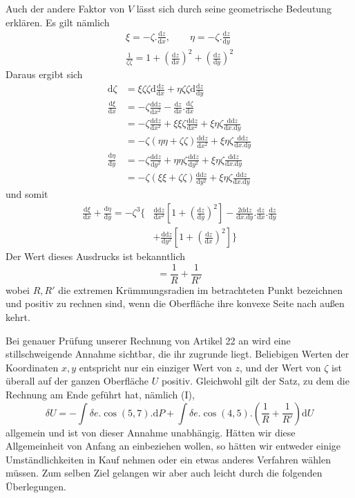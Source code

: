 Auch der andere Faktor von $V$ lässt sich durch seine geometrische Bedeutung erklären. Es gilt nämlich
\[
\begin{gathered}
\xi=-\zeta.\frac{\mathrm{d}z}{\mathrm{d}x},\qquad \eta=-\zeta.\frac{\mathrm{d}z}{\mathrm{d}y}\\
\frac{1}{\zeta\zeta}=1+(\frac{\mathrm{d}z}{\mathrm{d}x})^2+(\frac{\mathrm{d}z}{\mathrm{d}y})^2
\end{gathered}
\]
Daraus ergibt sich
\[
\begin{aligned}
\mathrm{d}\zeta&=\xi\zeta\zeta\mathrm{d}\frac{\mathrm{d}z}{\mathrm{d}x}+\eta\zeta\zeta\mathrm{d}\frac{\mathrm{d}z}{\mathrm{d}y}\\
\frac{\mathrm{d}\xi}{\mathrm{d}x}&=-\zeta\frac{\mathrm{dd}z}{\mathrm{d}x^2}-\frac{\mathrm{d}z}{\mathrm{d}x}.\frac{\mathrm{d}\zeta}{\mathrm{d}x}\\
&=-\zeta\frac{\mathrm{dd}z}{\mathrm{d}x^2}+\xi\xi\zeta\frac{\mathrm{dd}z}{\mathrm{d}x^2}+\xi\eta\zeta\frac{\mathrm{dd}z}{\mathrm{d}x.\mathrm{d}y}\\
&=-\zeta(\eta\eta+\zeta\zeta)\frac{\mathrm{dd}z}{\mathrm{d}x^2}+\xi\eta\zeta\frac{\mathrm{dd}z}{\mathrm{d}x.\mathrm{d}y}\\
\frac{\mathrm{d}\eta}{\mathrm{d}y}&=-\zeta\frac{\mathrm{dd}z}{\mathrm{d}y^2}+\eta\eta\zeta\frac{\mathrm{dd}z}{\mathrm{d}y^2}+\xi\eta\zeta\frac{\mathrm{dd}z}{\mathrm{d}x.\mathrm{d}y}\\
&=-\zeta(\xi\xi+\zeta\zeta)\frac{\mathrm{dd}z}{\mathrm{d}y^2}+\xi\eta\zeta\frac{\mathrm{dd}z}{\mathrm{d}x.\mathrm{d}y}
\end{aligned}
\]
und somit
\[
\begin{aligned}
\frac{\mathrm{d}\xi}{\mathrm{d}x}+\frac{\mathrm{d}\eta}{\mathrm{d}y}=-\zeta^3\big\{&\frac{\mathrm{dd}z}{\mathrm{d}x^2}[1+(\frac{\mathrm{d}z}{\mathrm{d}y})^2]-\frac{2\mathrm{dd}z}{\mathrm{d}x.\mathrm{d}y}.\frac{\mathrm{d}z}{\mathrm{d}x}.\frac{\mathrm{d}z}{\mathrm{d}y}\\
&+\frac{\mathrm{dd}z}{\mathrm{d}y^2}[1+(\frac{\mathrm{d}z}{\mathrm{d}x})^2]\big\}
\end{aligned}
\]
Der Wert dieses Ausdrucks ist bekanntlich
\[
=\frac{1}{R}+\frac{1}{R'}
\]
wobei $R,R'$ die extremen Krümmungsradien im betrachteten Punkt bezeichnen und positiv zu rechnen sind, wenn die Oberfläche ihre konvexe Seite nach außen kehrt.

Bei genauer Prüfung unserer Rechnung von Artikel 22 an wird eine stillschweigende Annahme sichtbar, die ihr zugrunde liegt. Beliebigen Werten der Koordinaten $x,y$ entspricht nur ein einziger Wert von $z$, und der Wert von $\zeta$ ist überall auf der ganzen Oberfläche $U$ positiv. Gleichwohl gilt der Satz, zu dem die Rechnung am Ende geführt hat, nämlich (I),
\[
\delta U=-\int\delta e.\cos(5,7).\mathrm{d}P+\int\delta e.\cos(4,5).(\frac{1}{R}+\frac{1}{R'})\mathrm{d}U
\]
allgemein und ist von dieser Annahme unabhängig. Hätten wir diese Allgemeinheit von Anfang an einbeziehen wollen, so hätten wir entweder einige Umständlichkeiten in Kauf nehmen oder ein etwas anderes Verfahren wählen müssen. Zum selben Ziel gelangen wir aber auch leicht durch die folgenden Überlegungen.

